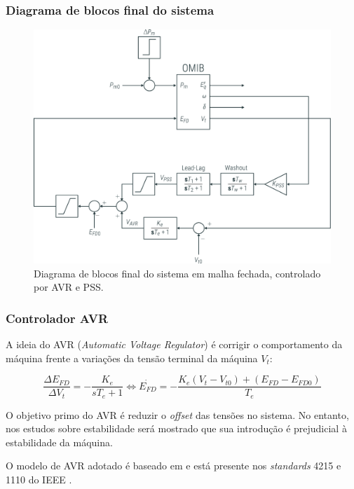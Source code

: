 \documentclass[10pt, compress,xcolor={svgnames,dvipsnames,x11names}]{beamer}
\begin{document}
\begin{frame}%
\frametitle{Diagrama de blocos final do sistema}
\scriptsize

\begin{figure}[htb]
	\begin{center}
	    \includegraphics[width = 0.8\columnwidth]{../images/presentation/diagramaDeBlocos.pdf}
	\end{center}
	\caption{\label{fig::diagramaDeBlocos} Diagrama de blocos final do sistema em malha fechada, controlado por AVR e PSS.}
\end{figure}

\normalsize
\end{frame}%

\begin{frame}%
\frametitle{Controlador AVR}
\scriptsize

	A ideia do AVR (\textit{Automatic Voltage Regulator}) é corrigir o comportamento da máquina frente a variações da tensão terminal da máquina $V_t$:

\begin{equation}
	\frac{\Delta E_{FD}}{\Delta V_t} = -\frac{K_e}{sT_e + 1} \Leftrightarrow \dot{E_{FD}} = - \frac{ K_e(V_t - V_{t0}) + (E_{FD} - E_{FD0})}{T_e} 
\end{equation}

	O objetivo primo do AVR é reduzir o \textit{offset} das tensões no sistema. No entanto, nos estudos sobre estabilidade será mostrado que sua introdução é prejudicial à estabilidade da máquina.

	O modelo de AVR adotado é baseado em \cite{concordia} e está presente nos \textit{standards} 4215 e 1110 do IEEE \cite{ieeeStd4215, ieeeStd1110}.
\normalsize
\end{frame}%
\end{document}
